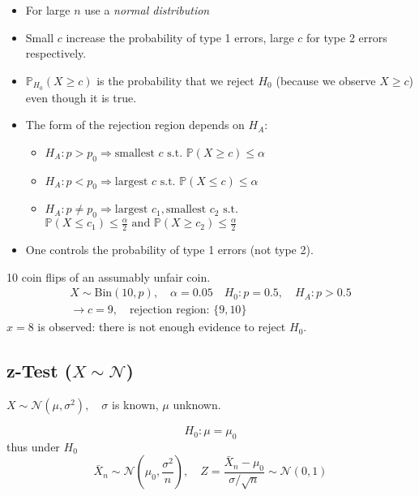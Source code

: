 \newpar{}
\begin{itemize}
    \item For large $n$ use a \textit{normal distribution}
    \item Small $c$ increase the probability of type 1 errors, large $c$ for type 2 errors respectively.
    \item $\mathbb{P}_{H_0}(X\geq c)$ is the probability that we reject $H_0$ (because we observe $X\geq c$) even though it is true.
    \item The form of the rejection region depends on $H_A$:
          \begin{itemize}
              \item $H_A: p>p_0 \Rightarrow \text{smallest }c\text{ s.t. } \mathbb{P}(X\geq c)\leq \alpha$
              \item $H_A: p<p_0 \Rightarrow \text{largest }c\text{ s.t. } \mathbb{P}(X\leq c)\leq \alpha$
              \item $H_A: p\neq p_0 \Rightarrow \text{largest } c_1, \text{smallest }c_2 \text{ s.t.}$\newline
                    $ \mathbb{P}(X\leq c_1)\leq \frac{\alpha}{2} \text{ and }\mathbb{P}(X\geq c_2)\leq \frac{\alpha}{2}$
          \end{itemize}
    \item One controls the probability of type 1 errors (not type 2).
\end{itemize}

\begin{examplesection}
    10 coin flips of an assumably unfair coin.
    \noindent\begin{gather*}
        X\sim \mathrm{Bin}(10,p),\quad \alpha = 0.05\quad H_0:p=0.5,\quad H_A: p>0.5\\
        \to c=9,\quad \text{rejection region: }\{9,10\}
    \end{gather*}
    $x=8$ is observed: there is not enough evidence to reject $H_0$.
\end{examplesection}

\subsection[z-Test]{z-Test ($X\sim\mathcal{N}$)}
$X\sim\mathcal{N}(\mu,\sigma^2), \quad \sigma$ is known, $\mu$ unknown.

\noindent\begin{equation*}
    H_0:\mu=\mu_0
\end{equation*}
thus under $H_0$
\noindent\begin{equation*}
    \bar{X}_n\sim\mathcal{N}\left(\mu_0,\frac{\sigma^2}n\right), \quad Z=\frac{\bar{X}_n-\mu_0}{\sigma/\sqrt{n}}\sim\mathcal{N}(0,1)
\end{equation*}

